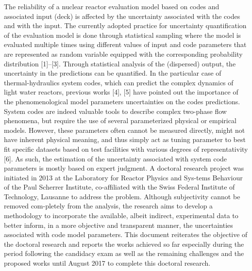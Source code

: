\documentclass[11pt,titlepage]{article}
\begin{document}
The  reliability of a nuclear reactor evaluation model based on codes and associated input (deck) is affected by the uncertainty associated with the codes and with the input. The currently adopted practice for uncertainty quantification of the evaluation model is done through statistical sampling where the model is evaluated multiple times using different values of input and code parameters that are represented as random variable equipped with the corresponding probability distribution [1]–[3]. Through statistical analysis of the (dispersed) output, the uncertainty in the predictions can be quantified. 
In the particular case of thermal-hydraulics system codes, which can predict the complex dynamics of light water reactors, previous works [4], [5] have pointed out the importance of the phenomenological model parameters uncertainties on the codes predictions. System codes are indeed valuable tools to describe complex two-phase flow phenomena, but require the use of several parameterized physical or empirical models. However, these parameters often cannot be measured directly, might not have inherent physical meaning, and thus simply act as tuning parameter to best fit specific datasets based on test facilities with various degrees of representativity [6]. As such, the estimation of the uncertainty associated with system code parameters is mostly based on expert judgment.
A doctoral research project was initiated in 2013 at the Laboratory for Reactor Physics and Sys-tems Behaviour of the Paul Scherrer Institute, co-affiliated with the Swiss Federal Institute of Technology, Lausanne to address the problem. Although subjectivity cannot be removed com-pletely from the analysis, the research aims to develop  a methodology to incorporate the available, albeit indirect, experimental data to better inform, in a more objective and transparent manner, the uncertainties associated with code model parameters.
This document reiterates the objective of the doctoral research and reports the works achieved so far especially during the period following the candidacy exam as well as the remaining challenges and the proposed works until August 2017 to complete this doctoral research.
\end{document}
